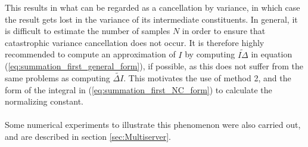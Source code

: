 This results in what can be regarded as a cancellation by variance, in which case the result gets lost in the variance of its intermediate constituents. In general, it is difficult to estimate the number of samples \(N\) in order to ensure that catastrophic variance cancellation does not occur. It is therefore highly recommended to compute an approximation of \(I\) by computing \(\widetilde{I\Delta}\) in equation (\ref{eq:summation_first_general_form}), if possible, as this does not suffer from the same problems as computing \(\widetilde{\Delta I}\). This motivates the use of method 2, and the form of the integral in (\ref{eq:summation_first_NC_form}) to calculate the normalizing constant.
\\\\
Some numerical experiments to illustrate this phenomenon were also carried out, and are described in section \ref{sec:Multiserver}.

